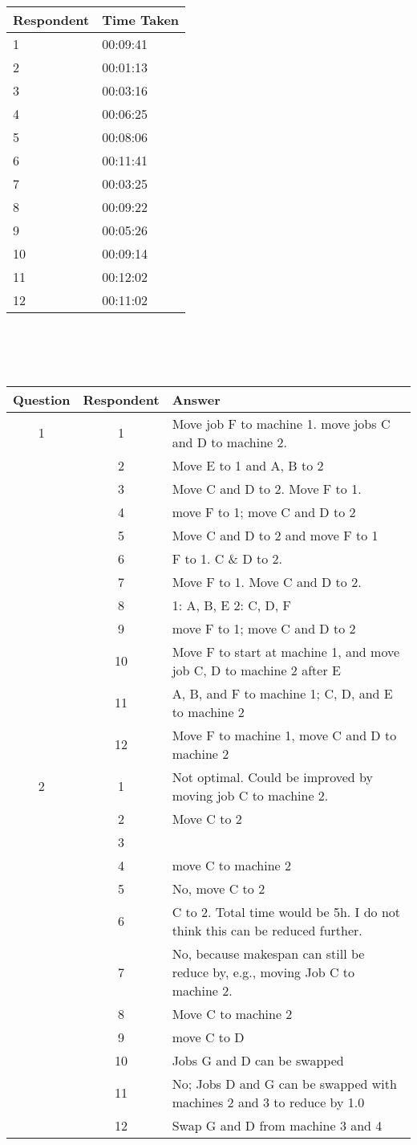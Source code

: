 \begin{tabular}{l l}
	Respondent & Time Taken \\
	\hline
	1 & 00:09:41 \\
	2 & 00:01:13 \\
	3 & 00:03:16 \\
	4 & 00:06:25 \\
	5 & 00:08:06 \\
	6 & 00:11:41 \\
	7 & 00:03:25 \\
	8 & 00:09:22 \\
	9 & 00:05:26 \\
	10 & 00:09:14 \\
	11 & 00:12:02 \\
	12 & 00:11:02 \\
\end{tabular}
\\\\\\
\begin{tabularx}{\linewidth}{c c X}
	Question & Respondent & Answer \\
	\hline
	1 & 1 & Move job F to machine 1. move jobs C and D to machine 2. \\
	& 2 & Move E to 1 and A, B to 2 \\
	& 3 & Move C and D to 2. Move F to 1. \\
	& 4 & move F to 1; move C and D to 2 \\
	& 5 & Move C and D to 2 and move F to 1 \\
	& 6 & F to 1. C \& D to 2. \\
	& 7 & Move F to 1. Move C and D to 2. \\
	& 8 & 1: A, B, E 2: C, D, F \\
	& 9 & move F to 1; move C and D to 2 \\
	& 10 & Move F to start at machine 1, and move job C, D to machine 2 after E \\
	& 11 & A, B, and F to machine 1; C, D, and E to machine 2 \\
	& 12 & Move F to machine 1, move C and D to machine 2 \\
	\hline
	2 & 1 & Not optimal. Could be improved by moving job C to machine 2. \\
	& 2 & Move C to 2 \\
	& 3 &  \\
	& 4 & move C to machine 2 \\
	& 5 & No, move C to 2 \\
	& 6 & C to 2. Total time would be 5h. I do not think this can be reduced further. \\
	& 7 & No, because makespan can still be reduce by, e.g., moving Job C to machine 2. \\
	& 8 & Move C to machine 2 \\
	& 9 & move C to D \\
	& 10 & Jobs G and D can be swapped \\
	& 11 & No; Jobs D and G can be swapped with machines 2 and 3 to reduce by 1.0 \\
	& 12 & Swap G and D from machine 3 and 4 \\
	\hline
\end{tabularx}
